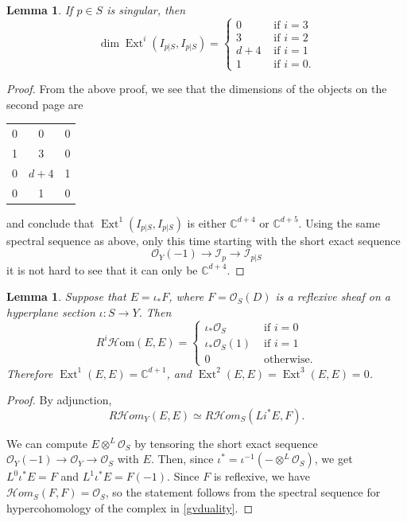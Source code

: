 \documentclass[11pt]{amsart}
\newtheorem{lemma}[thm]{Lemma}
\theoremstyle{definition}
\newcommand{\C}{\mathbb{C}}
\newcommand{\HHom}{\mathcal{H}om}
\DeclareMathOperator{\Ext}{Ext}
\newcommand{\sH}{\mathcal{H}}
\newcommand{\sO}{\mathcal{O}}
\newcommand{\AAA}[1]{\textcolor{red}{#1}}
\newcommand{\sI}{\mathcal{I}}
\begin{document}
\begin{lemma}\label{d+4}
If $p\in S$ is singular, then 
\[
\dim \Ext^i(I_{p|S},I_{p|S})=\begin{cases}
0 & \text{ if }i=3\\
3 & \text{ if }i=2\\
d+4 & \text{ if }i=1\\
1  & \text{ if }i=0.\end{cases}
\]
\end{lemma}
\begin{proof}
From the above proof, we see that the dimensions of the objects on the second page are 
\begin{center}
\begin{tabular}{c|cc}
0 & 0 &0\\
1 & 3 &0\\
0 & $d+4$ &1\\
0 & 1 &0\\
\hline
\end{tabular}
\end{center}
and conclude that $\Ext^1(I_{p|S},I_{p|S})$ is either $\C^{d+4}$ or $\C^{d+5}$. Using the same spectral sequence as above, only this time starting with the short exact sequence 
\begin{equation}
    \label{def_IpS}
    \sO_Y(-1)\rightarrow \sI_p\rightarrow \sI_{p|S}
\end{equation}
it is not hard to see that it can only be $\C^{d+4}$.
\end{proof}

\begin{lemma}\label{dimensiond+1}
Suppose that $E=\iota_\ast F$, where $F=\sO_S(D)$ is a reflexive sheaf on a hyperplane section $\iota :S\rightarrow Y$.  Then $$R^i\sH\text{om}(E,E)=\begin{cases} \iota_\ast\sO_S & \text{ if }i=0\\ \iota_\ast\sO_S(1) & \text{ if }i=1\\
0 & \text{ otherwise.}\end{cases}$$
Therefore $\Ext^1(E,E)=\C^{d+1}$, and $\Ext^2(E,E)=\Ext^3(E,E)=0$.
\end{lemma}
\begin{proof}
By adjunction, 
\begin{equation}\label{gvduality}
   R\HHom_Y(E,E) \simeq R\HHom_S(Li^*E,F). 
\end{equation}

We can compute $E\otimes^L\sO_S$ by tensoring the short exact sequence
$\sO_Y(-1)\rightarrow \sO_Y\to \sO_S$
with $E$. Then, since $\iota^\ast=\iota^{-1} (-\otimes^L\sO_S)$, we get $L^0\iota^\ast E=F$ and $L^1 \iota^\ast E=F(-1)$. Since $F$ is reflexive, we have $\sH om_S(F,F)=\sO_S$,  so the statement follows from the spectral sequence for hypercohomology of the complex in \eqref{gvduality}.
\end{proof}
\end{document}
